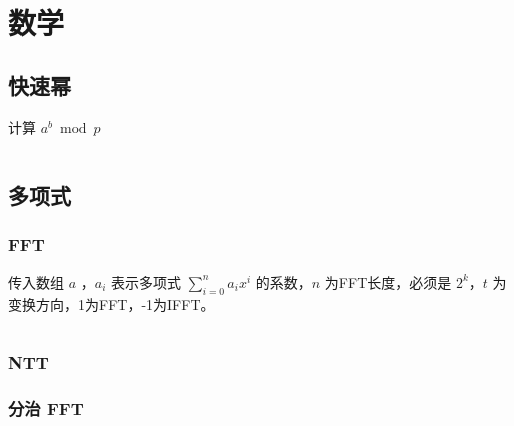 \documentclass[a4paper, twoside]{article}
\title{\vspace{20cm}\fontsize{50pt}{20pt}\selectfont{Standard Code Library}\\\fontsize{24pt}{\baselineskip}\selectfont{}\vspace{0.1cm}}
\author{\fontsize{15pt}{\baselineskip}\selectfont{XXX University}\vspace{0.2cm}\\\fontsize{12pt}{\baselineskip}\selectfont{WSFcloud}}
\date{}
\begin{document}
\begin{titlepage}
    \selectfont{\color{black}{\maketitle}}
	\thispagestyle{empty}
	\afterpage{\null\thispagestyle{empty}\newpage} %
\end{titlepage}

\pagestyle{plain}
\setcounter{page}{1}
\renewcommand{\contentsname}{\Huge \textbf{目录}}           %
\renewcommand{\cftsecdotsep}{4}                             %
\renewcommand{\cftsubsecdotsep}{4}                          %
\renewcommand{\cftsecfont}{\large\bfseries}                 %
\begin{center}
    \tableofcontents         
\end{center}
\ifodd\value{page}
    \afterpage{\null\thispagestyle{empty}\newpage}          %
\fi

\newpage
\pagestyle{fancy}
\setcounter{page}{1}
\section{数学}
\subsection{快速幂}
计算 $a^b \bmod p$
\inputminted{cpp}{../src/数学/快速幂.cpp}
\subsection{多项式}
    \subsubsection{FFT}
    传入数组 $a$ ，$a_i$ 表示多项式 $\sum\limits_{i=0}^{n} a_ix^i$ 的系数，$n$ 为FFT长度，必须是 $2^k$，$t$ 为变换方向，1为FFT，-1为IFFT。
    \inputminted{cpp}{../src/数学/FFT.cpp}
    
    \subsubsection{NTT}

    \subsubsection{分治 FFT}
\end{document}
